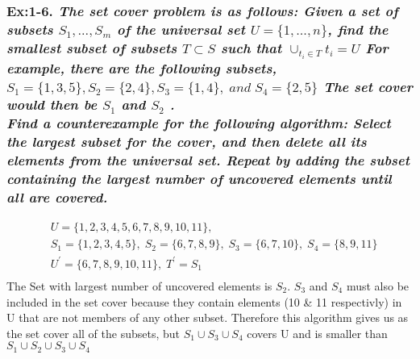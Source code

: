 
\subsubsection*{\textbf{\enspace Ex:1-6.} \emph{\textbf{The set cover problem is as follows: } Given a set of subsets $S_{1}, ..., S_{m}$ of the universal set 
$U = \{1, ..., n\}$, 
find the smallest subset of subsets 
$T \subset S$ 
such that  
$\cup_{t_{i} \in T}t_{i} = U$ For example, there are the following subsets, $S_{1} = \{1, 3, 5\}, S_{2} = \{2, 4\}, S_{3} = \{1, 4\}, \; and \; S_{4} = \{2, 5\}$ The set cover would then be $S_{1}$ and $S_{2}$ . } \\
\emph{\textbf{Find a counterexample for the following algorithm:} Select the largest subset for the cover, and then delete all its elements from the universal set. Repeat by adding the subset containing the largest number of uncovered elements until all are covered.}}


{\color{answer}{}
\begin{align*}
	&U = \{1,2,3,4,5,6,7,8,9,10,11\}, \\
	&S_{1} = \{1,2,3,4,5\}, \; S_{2} = \{6,7,8,9\}, \; S_{3} = \{6,7,10\}, \; S_{4} = \{8,9,11\} \\
	&U^{'} = \{6,7,8,9,10,11\}, \; T^{'} = S_{1} \\
\end{align*}
The Set with largest number of uncovered elements is $S_{2}$. $S_{3}$ and $S_{4}$ must also be included in the set cover because they contain elements (10 \& 11 respectivly)
in U that are not members of any other subset. Therefore this algorithm gives us as the set cover all of the subsets, but $S_{1} \cup S_{3} \cup S_{4}$ covers U and is smaller
than $S_{1} \cup S_{2} \cup S_{3} \cup S_{4}$
}








